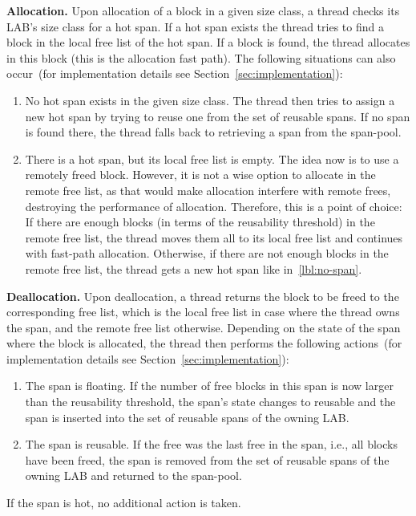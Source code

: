 \documentclass[10pt]{sigplanconf}
\newcommand{\OurSubsubsection}[1]{\smallbreak\noindent\textbf{#1}\xspace}
\begin{document}
\OurSubsubsection{Allocation.}
Upon allocation of a block in a given size class, a thread checks its LAB's size
class for a hot span. If a hot span exists the thread tries to find a block in
the local free list of the hot span. If a block is found, the thread allocates
in this block (this is the allocation fast path). The following situations can
also occur~(for implementation details see Section~\ref{sec:implementation}):
\begin{enumerate}[label=(\alph*),noitemsep]
  \item \label{lbl:no-span} No hot span exists in the given size class. The
    thread then tries to assign a new hot span by trying to reuse one from the
    set of reusable spans. If no span is found there, the thread falls back to
    retrieving a span from the span-pool.
  \item There is a hot span, but its local free list is empty. The idea now is
    to use a remotely freed block. However, it is not a wise option to allocate
    in the remote free list, as that would make allocation interfere with remote
    frees, destroying the performance of allocation. Therefore, this is a point
    of choice: If there are enough blocks (in terms of the reusability
    threshold) in the remote free list, the thread moves them all to its local
    free list and continues with fast-path allocation. Otherwise, if there are
    not enough blocks in the remote free list, the thread gets a new hot span
    like in~\ref{lbl:no-span}.
\end{enumerate}

\OurSubsubsection{Deallocation.}
Upon deallocation, a thread returns the block to be freed to the corresponding
free list, which is the local free list in case where the thread owns the span, and
the remote free list otherwise. Depending on the state of the span where the
block is allocated, the thread then performs the following actions~(for
implementation details see Section~\ref{sec:implementation}):
\begin{enumerate}[label=(\alph*),noitemsep]
  \item The span is floating. If the number of free blocks in this span is now
    larger than the reusability threshold, the span's state changes to reusable
    and the span is inserted into the set of reusable spans of the owning LAB.
  \item The span is reusable. If the free was the last free in the span, i.e.,
    all blocks have been freed, the span is removed from the set of reusable
    spans of the owning LAB and returned to the span-pool.
\end{enumerate}
If the span is hot, no additional action is taken.
\end{document}

